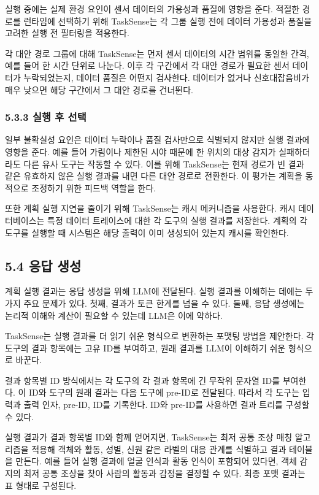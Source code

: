 \documentclass[sigconf,nonacm]{acmart}
\begin{document}
실행 중에는 실제 환경 요인이 센서 데이터의 가용성과 품질에 영향을 준다. 적절한 경로를 런타임에 선택하기 위해 TaskSense는 각 그룹 실행 전에 데이터 가용성과 품질을 고려한 실행 전 필터링을 적용한다.

각 대안 경로 그룹에 대해 TaskSense는 먼저 센서 데이터의 시간 범위를 동일한 간격, 예를 들어 한 시간 단위로 나눈다. 이후 각 구간에서 각 대안 경로가 필요한 센서 데이터가 누락되었는지, 데이터 품질은 어떤지 검사한다. 데이터가 없거나 신호대잡음비가 매우 낮으면 해당 구간에서 그 대안 경로를 건너뛴다.

\subsubsection{5.3.3 실행 후 선택}

일부 불확실성 요인은 데이터 누락이나 품질 검사만으로 식별되지 않지만 실행 결과에 영향을 준다. 예를 들어 가림이나 제한된 시야 때문에 한 위치의 대상 감지가 실패하더라도 다른 유사 도구는 작동할 수 있다. 이를 위해 TaskSense는 현재 경로가 빈 결과 같은 유효하지 않은 실행 결과를 내면 다른 대안 경로로 전환한다. 이 평가는 계획을 동적으로 조정하기 위한 피드백 역할을 한다.

또한 계획 실행 지연을 줄이기 위해 TaskSense는 캐시 메커니즘을 사용한다. 캐시 데이터베이스는 특정 데이터 트레이스에 대한 각 도구의 실행 결과를 저장한다. 계획의 각 도구를 실행할 때 시스템은 해당 출력이 이미 생성되어 있는지 캐시를 확인한다.

\subsection{5.4 응답 생성}

계획 실행 결과는 응답 생성을 위해 LLM에 전달된다. 실행 결과를 이해하는 데에는 두 가지 주요 문제가 있다. 첫째, 결과가 토큰 한계를 넘을 수 있다. 둘째, 응답 생성에는 논리적 이해와 계산이 필요할 수 있는데 LLM은 이에 약하다.

TaskSense는 실행 결과를 더 읽기 쉬운 형식으로 변환하는 포맷팅 방법을 제안한다. 각 도구의 결과 항목에는 고유 ID를 부여하고, 원래 결과를 LLM이 이해하기 쉬운 형식으로 바꾼다.

결과 항목별 ID 방식에서는 각 도구의 각 결과 항목에 긴 무작위 문자열 ID를 부여한다. 이 ID와 도구의 원래 결과는 다음 도구에 pre-ID로 전달된다. 따라서 각 도구는 입력과 출력 인자, pre-ID, ID를 기록한다. ID와 pre-ID를 사용하면 결과 트리를 구성할 수 있다.

실행 결과가 결과 항목별 ID와 함께 얻어지면, TaskSense는 최저 공통 조상 매칭 알고리즘을 적용해 객체와 활동, 성별, 신원 같은 라벨의 대응 관계를 식별하고 결과 테이블을 만든다. 예를 들어 실행 결과에 얼굴 인식과 활동 인식이 포함되어 있다면, 객체 감지의 최저 공통 조상을 찾아 사람의 활동과 감정을 결정할 수 있다. 최종 포맷 결과는 표 형태로 구성된다.
\end{document}
